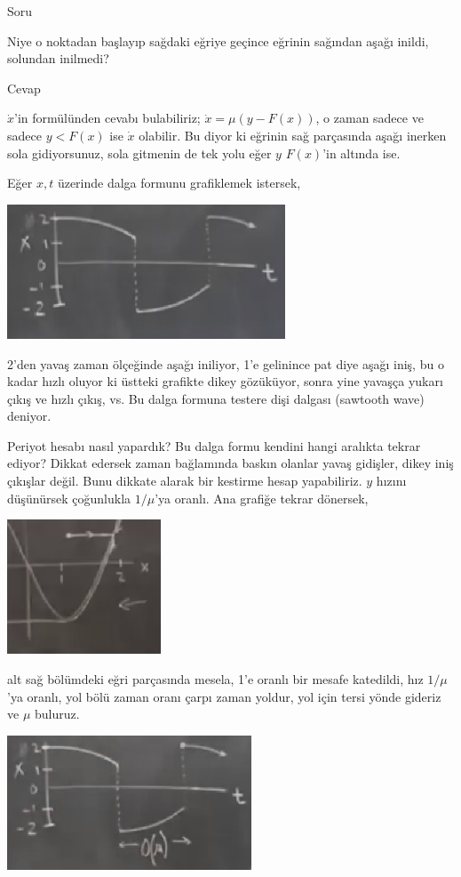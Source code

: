 \documentclass[12pt,fleqn]{article}\usepackage{../../common}
\begin{document}
Soru

Niye o noktadan başlayıp sağdaki eğriye geçince eğrinin sağından aşağı inildi,
solundan inilmedi?

Cevap

$\dot{x}$'in formülünden cevabı bulabiliriz; $\dot{x} = \mu (y-F(x))$, o zaman
sadece ve sadece $y < F(x)$ ise $\dot{x}$ olabilir. Bu diyor ki eğrinin sağ
parçasında aşağı inerken sola gidiyorsunuz, sola gitmenin de tek yolu eğer $y$
$F(x)$'in altında ise. 

Eğer $x,t$ üzerinde dalga formunu grafiklemek istersek,

\includegraphics[height=4cm]{10_04.png}

2'den yavaş zaman ölçeğinde aşağı iniliyor, 1'e gelinince pat diye aşağı iniş,
bu o kadar hızlı oluyor ki üstteki grafikte dikey gözüküyor, sonra yine yavaşça
yukarı çıkış ve hızlı çıkış, vs. Bu dalga formuna testere dişi dalgası (sawtooth
wave) deniyor.

Periyot hesabı nasıl yapardık? Bu dalga formu kendini hangi aralıkta tekrar
ediyor? Dikkat edersek zaman bağlamında baskın olanlar yavaş gidişler, dikey
iniş çıkışlar değil. Bunu dikkate alarak bir kestirme hesap yapabiliriz. $y$
hızını düşünürsek çoğunlukla $1/\mu$'ya oranlı. Ana grafiğe tekrar dönersek,

\includegraphics[height=4cm]{10_05.png}

alt sağ bölümdeki eğri parçasında mesela, 1'e oranlı bir mesafe katedildi, hız
$1/\mu$'ya oranlı, yol bölü zaman oranı çarpı zaman yoldur, yol için tersi yönde
gideriz ve $\mu$ buluruz. 

\includegraphics[height=4cm]{10_06.png}
\end{document}

